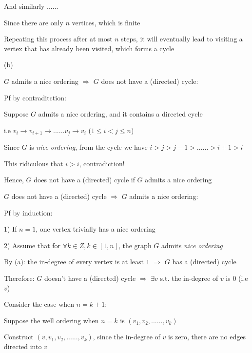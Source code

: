 \documentclass[11pt,twoside]{article}
\begin{document}
And similarly ......

Since there are only $n$ vertices, which is finite

Repeating this process after at most $n$ steps, it will eventually lead to visiting a vertex that has already been visited, which forms a cycle

\hspace*{\fill}

(b)

$G$ admits a nice ordering $\Rightarrow$ $G$ does not have a (directed) cycle:

Pf by contraditction:

Suppose $G$ admits a nice ordering, and it contains a directed cycle

i.e $v_i\rightarrow v_{i+1} \rightarrow ...... v_j \rightarrow v_i$ ($1\leq i< j\leq n$)

Since $G$ is \textit{nice ordering}, from the cycle we have $i>j>j-1>......>i+1>i$

This ridiculous that $i>i$, contradiction!

Hence, $G$ does not have a (directed) cycle if $G$ admits a nice ordering 

\hspace*{\fill}

$G$ does not have a (directed) cycle $\Rightarrow$ $G$ admits a nice ordering:



Pf by induction:

1) If $n =1 $, one vertex trivially has a nice ordering

2) Assume that for $\forall k \in Z, k \in [1,n]$, the graph $G$ admits \textit{nice ordering}

By (a): the in-degree of every vertex is at least $1$ $\Rightarrow$ $G$ has a (directed) cycle

Therefore: $G$ doesn't have a (directed) cycle $\Rightarrow$ $\exists v$ s.t. the in-degree of $v$ is $0$ (i.e $v$)

Consider the case when $n = k + 1$:

Suppose the well ordering when $n = k$ is $(v_1, v_2, ......, v_k)$

Construct $(v,v_1, v_2, ......, v_k)$, since the in-degree of $v$ is zero, there are no edges directed into $v$
\end{document}
